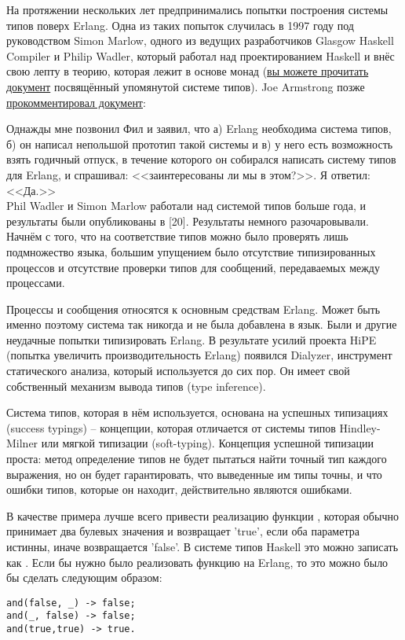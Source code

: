 На протяжении нескольких лет предпринимались попытки построения системы типов поверх Erlang.
Одна из таких попыток случилась в 1997 году под руководством Simon Marlow, одного из ведущих разработчиков Glasgow Haskell Compiler и Philip Wadler, который работал над проектированием Haskell и внёс свою лепту в теорию, которая лежит в основе монад (\href{http://www.haskell.org/~simonmar/papers/erltc.pdf}{вы можете прочитать документ} посвящённый упомянутой системе типов).
Joe Armstrong позже \href{http://www.cs.chalmers.se/Cs/Grundutb/Kurser/ppxt/HT2007/general/languages/armstrong-erlang\_history.pdf}{прокомментировал документ}:\\
\colorbox{lgray}
{
    \begin{minipage}{\linewidth}
Однажды мне позвонил Фил и заявил, что а) Erlang необходима система типов, б) он написал непольшой прототип такой системы и в) у него есть возможность взять годичный отпуск, в течение которого он собирался написать систему типов для Erlang, и спрашивал: <<заинтересованы ли мы в этом?>>.
Я ответил: <<Да.>>\\
Phil Wadler и Simon Marlow работали над системой типов больше года, и результаты были опубликованы в [20].
Результаты немного разочаровывали.
Начнём с того, что на соответствие типов можно было проверять лишь подмножество языка, большим упущением было отсутствие типизированных процессов и отсутствие проверки типов для сообщений, передаваемых между процессами.
    \end{minipage}
}

Процессы и сообщения относятся к основным средствам Erlang.
Может быть именно поэтому система так никогда и не была добавлена в язык.
Были и другие неудачные попытки типизировать Erlang.
В результате усилий проекта HiPE (попытка увеличить производительность Erlang) появился Dialyzer, инструмент статического анализа, который используется до сих пор.
Он имеет свой собственный механизм вывода типов (type inference).

Система типов, которая в нём используется, основана на успешных типизациях (success typings) \--- концепции, которая отличается от системы типов Hindley\--Milner или мягкой типизации (soft\--typing).
Концепция успешной типизации проста: метод определение типов не будет пытаться найти точный тип каждого выражения, но он будет гарантировать, что выведенные им типы точны, и что ошибки типов, которые он находит, действительно являются ошибками.

В качестве примера лучше всего привести реализацию функции , которая обычно принимает два булевых значения и возвращает 'true', если оба параметра истинны, иначе возвращается 'false'.
В системе типов Haskell это можно записать как .
Если бы нужно было реализовать функцию  на Erlang, то это можно было бы сделать следующим образом:
\begin{lstlisting}[style=erlang]
and(false, _) -> false;
and(_, false) -> false;
and(true,true) -> true.
\end{lstlisting}

